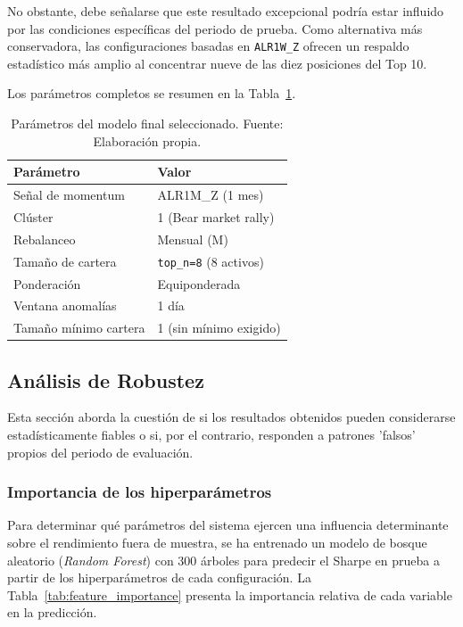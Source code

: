 No obstante, debe señalarse que este resultado excepcional
podría estar influido por las condiciones específicas del
periodo de prueba. Como alternativa más conservadora, las
configuraciones basadas en \texttt{ALR1W\_Z} ofrecen un
respaldo estadístico más amplio al concentrar nueve de las
diez posiciones del Top 10.

Los parámetros completos se resumen en la
Tabla~\ref{tab:modelo_final}.

\begin{table}[H]
\centering
\small
\begin{tabular}{ll}
\toprule
\textbf{Parámetro} & \textbf{Valor} \\
\midrule
Señal de momentum    & ALR1M\_Z (1 mes) \\
Clúster              & 1 (Bear market rally) \\
Rebalanceo           & Mensual (M) \\
Tamaño de cartera    & \texttt{top\_n=8} (8 activos) \\
Ponderación          & Equiponderada \\
Ventana anomalías    & 1 día \\
Tamaño mínimo cartera& 1 (sin mínimo exigido) \\
\bottomrule
\end{tabular}
\caption{Parámetros del modelo final seleccionado.
Fuente: Elaboración propia.}
\label{tab:modelo_final}
\end{table}


\subsection{Análisis de Robustez}

Esta sección aborda la cuestión de si los resultados obtenidos
pueden considerarse estadísticamente fiables o si, por el
contrario, responden a patrones 'falsos' propios del periodo de
evaluación.

\subsubsection{Importancia de los hiperparámetros}

Para determinar qué parámetros del sistema ejercen una influencia
determinante sobre el rendimiento fuera de muestra, se ha
entrenado un modelo de bosque aleatorio (\textit{Random Forest})
con 300 árboles para predecir el Sharpe en prueba a partir de los
hiperparámetros de cada configuración. La
Tabla~\ref{tab:feature_importance} presenta la importancia
relativa de cada variable en la predicción.

